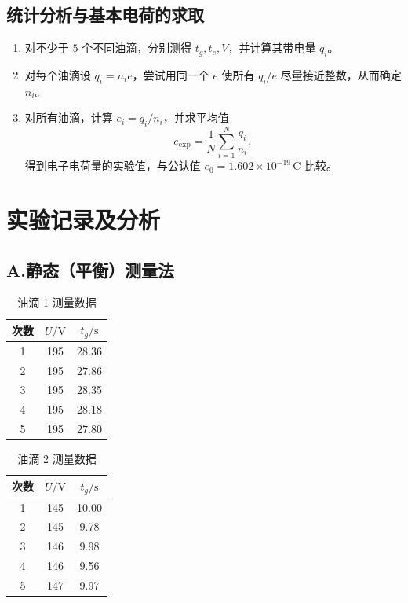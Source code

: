 \documentclass[a4paper,8pt,twocolumn]{article}
\begin{document}
\subsection{统计分析与基本电荷的求取}

\begin{enumerate}[label=\arabic*)]
  \item 对不少于 $5$ 个不同油滴，分别测得 $t_g,t_e,V$，并计算其带电量 $q_i$。
  \item 对每个油滴设 $q_i=n_i e$，尝试用同一个 $e$ 使所有 $q_i/e$ 尽量接近整数，从而确定 $n_i$。
  \item 对所有油滴，计算 $e_i=q_i/n_i$，并求平均值
  \[
    e_\mathrm{exp}=\frac{1}{N}\sum_{i=1}^N\frac{q_i}{n_i},
  \]
  得到电子电荷量的实验值，与公认值
  \(
    e_0=1.602\times10^{-19}\,\si{\coulomb}
  \)
  比较。
\end{enumerate}

\section{实验记录及分析}

\subsection*{A.\;静态（平衡）测量法}


\begin{table}[H]
\centering
\caption{油滴 1 测量数据}
\begin{tabular}{ccc}
\hline
次数 & $U/\mathrm{V}$ & $t_g/\mathrm{s}$ \\
\hline
1 & 195 & 28.36 \\
2 & 195 & 27.86 \\
3 & 195 & 28.35 \\
4 & 195 & 28.18 \\
5 & 195 & 27.80 \\
\hline
\end{tabular}
\end{table}

\begin{table}[H]
\centering
\caption{油滴 2 测量数据}
\begin{tabular}{ccc}
\hline
次数 & $U/\mathrm{V}$ & $t_g/\mathrm{s}$ \\
\hline
1 & 145 & 10.00 \\
2 & 145 &  9.78 \\
3 & 146 &  9.98 \\
4 & 146 &  9.56 \\
5 & 147 &  9.97 \\
\hline
\end{tabular}
\end{table}
\end{document}
